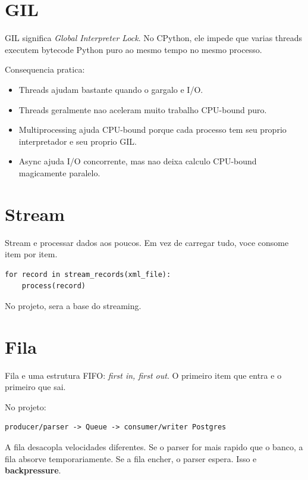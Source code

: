 \section{GIL}

GIL significa \textit{Global Interpreter Lock}. No CPython, ele impede que varias threads executem bytecode Python puro ao mesmo tempo no mesmo processo.

Consequencia pratica:

\begin{itemize}
  \item Threads ajudam bastante quando o gargalo e I/O.
  \item Threads geralmente nao aceleram muito trabalho CPU-bound puro.
  \item Multiprocessing ajuda CPU-bound porque cada processo tem seu proprio interpretador e seu proprio GIL.
  \item Async ajuda I/O concorrente, mas nao deixa calculo CPU-bound magicamente paralelo.
\end{itemize}

\section{Stream}

Stream e processar dados aos poucos. Em vez de carregar tudo, voce consome item por item.

\begin{lstlisting}[style=devbutterpython]
for record in stream_records(xml_file):
    process(record)
\end{lstlisting}

No projeto,  sera a base do streaming.

\section{Fila}

Fila e uma estrutura FIFO: \textit{first in, first out}. O primeiro item que entra e o primeiro que sai.

No projeto:

\begin{verbatim}
producer/parser -> Queue -> consumer/writer Postgres
\end{verbatim}

A fila desacopla velocidades diferentes. Se o parser for mais rapido que o banco, a fila absorve temporariamente. Se a fila encher, o parser espera. Isso e \textbf{backpressure}.

